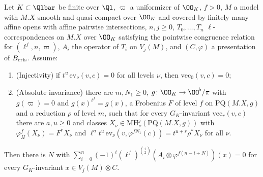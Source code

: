 \begin{theorem}\label{pf:steps1:top}
Let $K\subset\Qlbar$ be finite over $\Ql$, $\varpi$ a uniformizer of $\OO_K$, $f>0$, $M$ a model with $M.X$ smooth and quasi-compact
over $\OO_K$ and covered by finitely many affine opens with affine pairwise intersections, $n,j\ge0$, $T_0,\dots,T_n$
$\ell$-correspondences on $M.X$ over $\OO_K$ satisfying the pointwise congruence relation for $(\ell^f,n,\varpi)$, $A_i$ the operator
of $T_i$ on $V_j(M)$, and $(C,\varphi)$ a presentation of $B_{\mathrm{cris}}$. Assume:
\begin{enumerate}[label=\textup{(\alph*)},nosep]
\item \textup{(Injectivity)} if $t^u\,\mathrm{ev}_\nu(v,c)=0$ for all levels $\nu$, then $\mathrm{vec}_0(v,c)=0$;
\item \textup{(Absolute invariance)} there are $m,N_1\ge0$, $g\colon\OO_K\to\OO^\flat/\pi$ with $g(\varpi)=0$ and $g(x)^{\ell^f}=g(x)$, a
  Frobenius $F$ of level $f$ on $\mathrm{PQ}(M.X,g)$ and a reduction $\rho$ of level $m$, such that for every $G_K$-invariant
  $\mathrm{vec}_r(v,c)$ there are $a,u\ge0$ and classes $X_\nu\in\mathrm{MH}^j_\nu(\mathrm{PQ}(M.X,g))$ with $\varphi_H^f(X_\nu)=F^*X_\nu$
  and $\ell^at^u\,\mathrm{ev}_\nu(v,\varphi^{fN_1}(c))=t^{u+r}\rho^*X_\nu$ for all $\nu$.
\end{enumerate}
Then there is $N$ with $\sum_{i=0}^n(-1)^i(\ell^f)^{\binom i2}(A_i\otimes\varphi^{f(n-i+N)})(x)=0$ for every $G_K$-invariant
$x\in V_j(M)\otimes C$.
\end{theorem}


